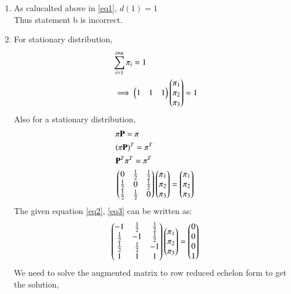\documentclass[journal,12pt,twocolumn]{IEEEtran}
\begin{document}
\begin{enumerate}
    \item{As calucalted above in \ref{eq1}, $d(1)=1$\\
    Thus statement b is incorrect.}\\
    \item{For stationary distribution,
    \begin{align}
    &\sum_{i=1}^{i=n} \pi_i = 1 \\
    &\implies\begin{pmatrix}1&1&1\end{pmatrix}\begin{pmatrix}\pi_1\\\pi_2\\\pi_3\end{pmatrix}=1\label{eq2}
    \end{align}
    Also for a stationary distribution,
    \begin{align}
    &\pi \mathbf{P} = \pi \\
    &(\pi \mathbf{P})^T = \pi^T \\
    &\mathbf{P}^T\pi^T=\pi^T\\
    &\begin{pmatrix}0&\frac{1}{2}&\frac{1}{2}\\\frac{1}{2}&0&\frac{1}{2}\\\frac{1}{2}&\frac{1}{2}&0\end{pmatrix}\begin{pmatrix}\pi_1\\\pi_2\\\pi_3\end{pmatrix}=\begin{pmatrix}\pi_1\\\pi_2\\\pi_3\end{pmatrix} \label{eq3}  
\end{align}
    The given equation \ref{eq2}, \ref{eq3} can be written as:\\
    \begin{align}
    \begin{pmatrix}-1&\frac{1}{2}&\frac{1}{2}\\\frac{1}{2}&-1&\frac{1}{2}\\\frac{1}{2}&\frac{1}{2}&-1\\1&1&1\end{pmatrix}\begin{pmatrix}\pi_1\\\pi_2\\\pi_3\end{pmatrix}=\begin{pmatrix}0\\0\\0\\1\end{pmatrix}
    \end{align}
    We need to solve the augmented matrix to row reduced echelon form to get the solution,    
    \begin{align}

\end{align}}
\end{enumerate}
\end{document}
